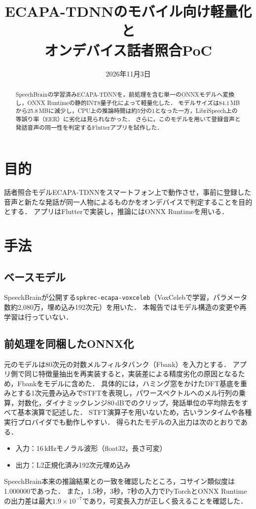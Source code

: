 \documentclass[paper=a4paper,fontsize=10.5pt]{jlreq}
\title{ECAPA-TDNNのモバイル向け軽量化と\\オンデバイス話者照合PoC}
\date{2026年11月3日}
\begin{document}
\maketitle

\begin{abstract}
SpeechBrainの学習済みECAPA-TDNNを，前処理を含む単一のONNXモデルへ変換し，ONNX Runtimeの静的INT8量子化によって軽量化した．
モデルサイズは84.1\,MBから25.8\,MBに減少し，CPU上の推論時間は約5分の1となった一方，LibriSpeech上の等誤り率（EER）に劣化は見られなかった．
さらに，このモデルを用いて登録音声と発話音声の同一性を判定するFlutterアプリを試作した．
\end{abstract}

\section{目的}
話者照合モデルECAPA-TDNNをスマートフォン上で動作させ，事前に登録した音声と新たな発話が同一人物によるものかをオンデバイスで判定することを目的とする．
アプリはFlutterで実装し，推論にはONNX Runtimeを用いる．

\section{手法}

\subsection{ベースモデル}
SpeechBrainが公開する\texttt{spkrec-ecapa-voxceleb}（VoxCelebで学習，パラメータ数約2,080万，埋め込み192次元）を用いた．
本報告ではモデル構造の変更や再学習は行っていない．

\subsection{前処理を同梱したONNX化}
元のモデルは80次元の対数メルフィルタバンク（Fbank）を入力とする．
アプリ側で同じ特徴量抽出を再実装すると，実装差による精度劣化の原因となるため，Fbankをモデルに含めた．
具体的には，ハミング窓をかけたDFT基底を重みとする1次元畳み込みでSTFTを表現し，パワースペクトルへのメル行列の乗算，対数化，ダイナミックレンジ80\,dBでのクリップ，発話単位の平均除去をすべて基本演算で記述した．
STFT演算子を用いないため，古いランタイムや各種実行プロバイダでも動作しやすい．
得られたモデルの入出力は次のとおりである．
\begin{itemize}
  \item 入力：16\,kHzモノラル波形（float32，長さ可変）
  \item 出力：L2正規化済み192次元埋め込み
\end{itemize}
SpeechBrain本来の推論結果との一致を確認したところ，コサイン類似度は1.000000であった．
また，1.5秒，3秒，7秒の入力でPyTorchとONNX Runtimeの出力差は最大$1.9\times10^{-7}$であり，可変長入力が正しく扱えることを確認した．
\end{document}
